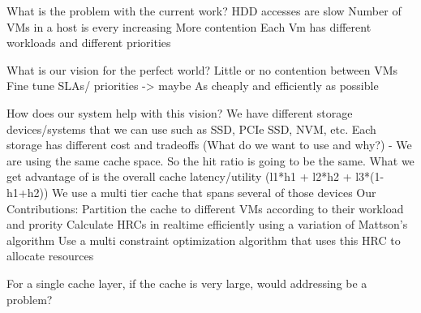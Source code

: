 What is the problem with the current work?
    HDD accesses are slow
    Number of VMs in a host is every increasing
        More contention
        Each Vm has different workloads and different priorities

What is our vision for the perfect world?
    Little or no contention between VMs
    Fine tune SLAs/ priorities -> maybe
    As cheaply and efficiently as possible

How does our system help with this vision?
    We have different storage devices/systems that we can use such as SSD, PCIe SSD, NVM, etc.
        Each storage has different cost and tradeoffs
        (What do we want to use and why?)
            - We are using the same cache space. So the hit ratio is going to be the same. What we get advantage of is the overall cache latency/utility (l1*h1 + l2*h2 + l3*(1-h1+h2))
    We use a multi tier cache that spans several of those devices
    Our Contributions:
        Partition the cache to different VMs according to their workload and prority
        Calculate HRCs in realtime efficiently using a variation of Mattson's algorithm
        Use a multi constraint optimization algorithm that uses this HRC to allocate resources

For a single cache layer, if the cache is very large, would addressing be a problem?
